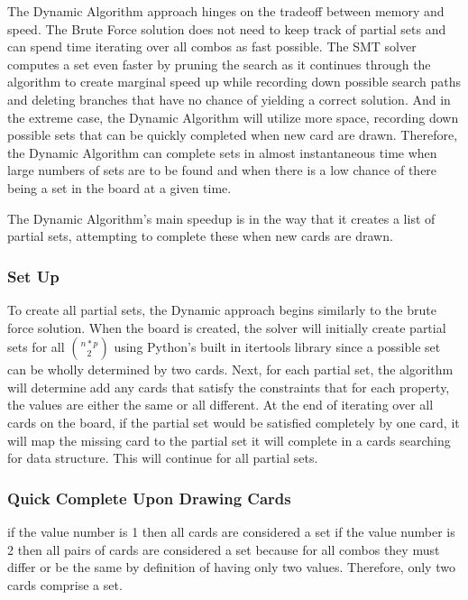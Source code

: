\documentclass[pageno]{jpaper}
\begin{document}
The Dynamic Algorithm approach hinges on the tradeoff between memory and speed. The Brute Force solution does not need to keep track of partial sets and can spend time iterating over all combos as fast possible. The SMT solver computes a set even faster by pruning the search as it continues through the algorithm to create marginal speed up while recording down possible search paths and deleting branches that have no chance of yielding a correct solution. And in the extreme case, the Dynamic Algorithm will utilize more space, recording down possible sets that can be quickly completed when new card are drawn. Therefore, the Dynamic Algorithm can complete sets in almost instantaneous time when large numbers of sets are to be found and when there is a low chance of there being a set in the board at a given time. 

The Dynamic Algorithm's main speedup is in the way that it creates a list of partial sets, attempting to complete these when new cards are drawn. 

\subsubsection{Set Up}

To create all partial sets, the Dynamic approach begins similarly to the brute force solution. When the board is created, the solver will initially create partial sets for all ${n*p}\choose{2}$ using Python's built in itertools library since a possible set can be wholly determined by two cards. Next, for each partial set, the algorithm will determine add any cards that satisfy the constraints that for each property, the values are either the same or all different. At the end of iterating over all cards on the board, if the partial set would be satisfied completely by one card, it will map the missing card to the partial set it will complete in a cards searching for data structure. This will continue for all partial sets. 


\subsubsection{Quick Complete Upon Drawing Cards}



if the value number is 1 then all cards are considered a set
if the value number is 2 then all pairs of cards are considered a set because for all combos they must differ or be the same by definition of having only two values. Therefore, only two cards comprise a set. 
\end{document}
